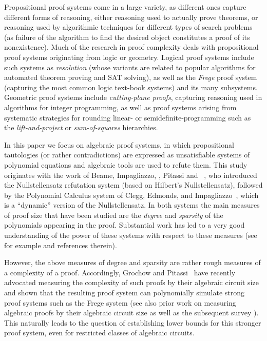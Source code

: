 \documentclass[11pt]{article}
\numberwithin{equation}{section}
\theoremstyle{definition}
\theoremstyle{plain}
\begin{document}
Propositional proof systems come in a large variety, as different ones capture different forms of reasoning, either reasoning used to actually prove theorems, or reasoning used by algorithmic techniques for different types of search problems (as failure of the algorithm to find the desired object constitutes a proof of its nonexistence). Much of the research in proof complexity deals with propositional proof systems originating from logic or geometry.  Logical proof systems include such systems as \emph{resolution} (whose variants are related to popular algorithms for automated theorem proving and SAT solving), as well as the \emph{Frege} proof system (capturing the most common logic text-book systems) and its many subsystems. Geometric proof systems include \emph{cutting-plane proofs}, capturing reasoning used in algorithms for integer programming, as well as proof systems arising from systematic strategies for rounding linear- or semidefinite-programming such as the \emph{lift-and-project} or \emph{sum-of-squares} hierarchies.

In this paper we focus on algebraic proof systems, in which propositional tautologies (or rather contradictions) are expressed as unsatisfiable systems of polynomial equations and algebraic tools are used to refute them. This study originates with the work of  Beame, Impagliazzo, \Krajicek, Pitassi and \Pudlak~\cite{BeameIKPP96}, who introduced the  Nullstellensatz refutation system (based on Hilbert's Nullstellensatz), followed by the Polynomial Calculus system of Clegg, Edmonds, and Impagliazzo~\cite{CleggEI96}, which is a ``dynamic'' version of the
Nullstellensatz. In both systems the main measures of proof size that have been studied are the \emph{degree} and \emph{sparsity} of the polynomials appearing in the proof. Substantial work has %
led  %
to a very good understanding of the power of these systems with respect to these measures (see for example \cite{BussIKPRS96,Razborov98,Grigoriev98,IPS99,BussGIP01,AlekhnovichRazborov01} and references therein).

However, the above measures of degree and sparsity are rather rough measures of a complexity of a proof. Accordingly,
Grochow and Pitassi~\cite{DBLP:journals/jacm/GrochowP18} have recently advocated measuring the complexity of such proofs by their algebraic circuit size and shown that the resulting proof system can polynomially simulate strong proof systems such as the Frege system (see also prior work on measuring algebraic proofs by their algebraic circuit size \cite{Pitassi97,GrigorievHirsch03,RazTzameret08a,RazTzameret08b,Tzameret11} as well as the subsequent survey \cite{PitassiT16}). %
%
 This naturally leads to the question of establishing lower bounds for this stronger proof system, even for restricted classes of algebraic circuits.
\end{document}
